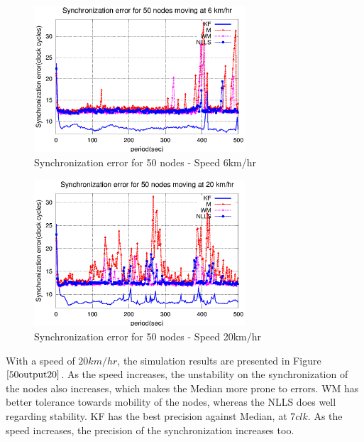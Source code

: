 \documentclass[a4paper,10pt]{report}
\begin{document}
\paragraph*{}
\begin{figure}
\centering
\includegraphics[width=0.7\textwidth]{50output-s6}
\caption{Synchronization error for 50 nodes - Speed 6km/hr}
\label{50output6}
\end{figure}
\begin{figure}
\centering
\includegraphics[width=0.7\textwidth]{50output-s20}
\caption{Synchronization error for 50 nodes - Speed 20km/hr} \label{50output20}
\end{figure}
With a speed of $20km/hr$, the simulation results are presented in Figure $\ref{50output20}$. As the speed increases, the unstability on the synchronization of the nodes also increases, which makes the Median more prone to errors. WM has better tolerance towards mobility of the nodes, whereas the NLLS does well regarding stability. KF has the best precision against Median, at $7clk$. As the speed increases, the precision of the synchronization increases too.%
\end{document}
